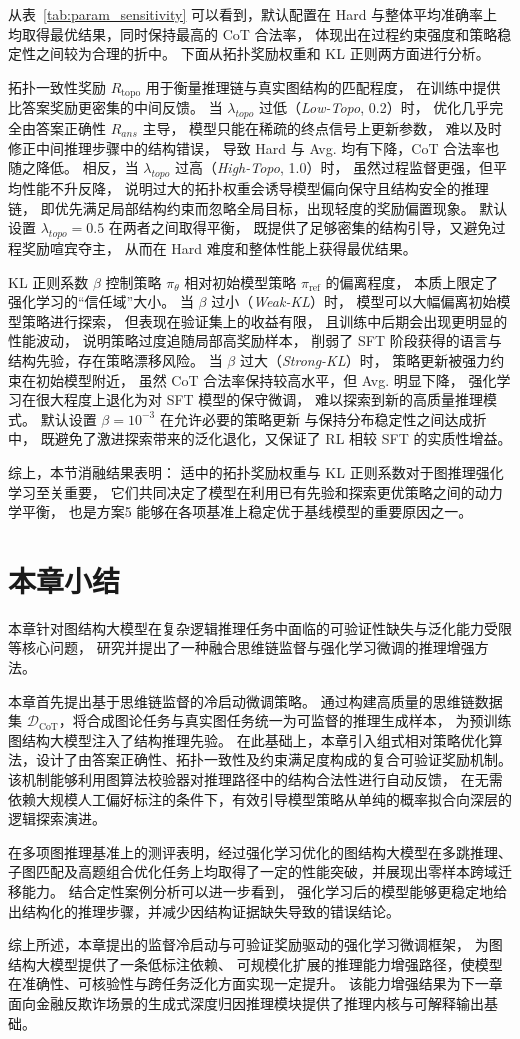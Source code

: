 从表~\ref{tab:param_sensitivity} 可以看到，默认配置在 Hard 与整体平均准确率上
均取得最优结果，同时保持最高的 CoT 合法率，
体现出在过程约束强度和策略稳定性之间较为合理的折中。
下面从拓扑奖励权重和 KL 正则两方面进行分析。

拓扑一致性奖励 $R_{\text{topo}}$ 用于衡量推理链与真实图结构的匹配程度，
在训练中提供比答案奖励更密集的中间反馈。
当 $\lambda_{topo}$ 过低（\textit{Low-Topo}, 0.2）时，
优化几乎完全由答案正确性 $R_{ans}$ 主导，
模型只能在稀疏的终点信号上更新参数，
难以及时修正中间推理步骤中的结构错误，
导致 Hard 与 Avg. 均有下降，CoT 合法率也随之降低。
相反，当 $\lambda_{topo}$ 过高（\textit{High-Topo}, 1.0）时，
虽然过程监督更强，但平均性能不升反降，
说明过大的拓扑权重会诱导模型偏向保守且结构安全的推理链，
即优先满足局部结构约束而忽略全局目标，出现轻度的奖励偏置现象。
默认设置 $\lambda_{topo}=0.5$ 在两者之间取得平衡，
既提供了足够密集的结构引导，又避免过程奖励喧宾夺主，
从而在 Hard 难度和整体性能上获得最优结果。

KL 正则系数 $\beta$ 控制策略 $\pi_\theta$ 相对初始模型策略 $\pi_{\text{ref}}$ 的偏离程度，
本质上限定了强化学习的“信任域”大小。
当 $\beta$ 过小（\textit{Weak-KL}）时，
模型可以大幅偏离初始模型策略进行探索，
但表现在验证集上的收益有限，
且训练中后期会出现更明显的性能波动，
说明策略过度追随局部高奖励样本，
削弱了 SFT 阶段获得的语言与结构先验，存在策略漂移风险。
当 $\beta$ 过大（\textit{Strong-KL}）时，
策略更新被强力约束在初始模型附近，
虽然 CoT 合法率保持较高水平，但 Avg. 明显下降，
强化学习在很大程度上退化为对 SFT 模型的保守微调，
难以探索到新的高质量推理模式。
默认设置 $\beta=10^{-3}$ 在允许必要的策略更新
与保持分布稳定性之间达成折中，
既避免了激进探索带来的泛化退化，又保证了 RL 相较 SFT 的实质性增益。

综上，本节消融结果表明：
适中的拓扑奖励权重与 KL 正则系数对于图推理强化学习至关重要，
它们共同决定了模型在利用已有先验和探索更优策略之间的动力学平衡，
也是方案5 能够在各项基准上稳定优于基线模型的重要原因之一。

\section{本章小结}

本章针对图结构大模型在复杂逻辑推理任务中面临的可验证性缺失与泛化能力受限等核心问题，
研究并提出了一种融合思维链监督与强化学习微调的推理增强方法。

本章首先提出基于思维链监督的冷启动微调策略。
通过构建高质量的思维链数据集 $\mathcal{D}_{\mathrm{CoT}}$，将合成图论任务与真实图任务统一为可监督的推理生成样本，
为预训练图结构大模型注入了结构推理先验。
在此基础上，本章引入组式相对策略优化算法，设计了由答案正确性、拓扑一致性及约束满足度构成的复合可验证奖励机制。
该机制能够利用图算法校验器对推理路径中的结构合法性进行自动反馈，
在无需依赖大规模人工偏好标注的条件下，有效引导模型策略从单纯的概率拟合向深层的逻辑探索演进。

在多项图推理基准上的测评表明，经过强化学习优化的图结构大模型在多跳推理、
子图匹配及高题组合优化任务上均取得了一定的性能突破，并展现出零样本跨域迁移能力。
结合定性案例分析可以进一步看到，
强化学习后的模型能够更稳定地给出结构化的推理步骤，并减少因结构证据缺失导致的错误结论。

综上所述，本章提出的监督冷启动与可验证奖励驱动的强化学习微调框架，
为图结构大模型提供了一条低标注依赖、
可规模化扩展的推理能力增强路径，使模型在准确性、可核验性与跨任务泛化方面实现一定提升。
该能力增强结果为下一章面向金融反欺诈场景的生成式深度归因推理模块提供了推理内核与可解释输出基础。

